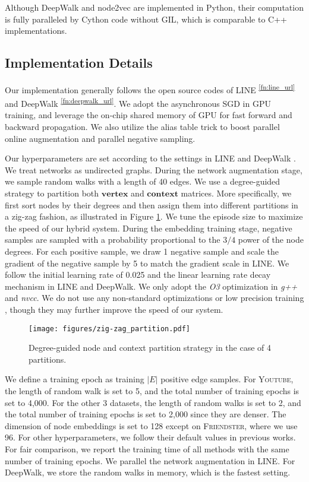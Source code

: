 \documentclass[sigconf]{acmart}
\newcommand{\dataset}[1]{\textsc{#1}\xspace}
\newcommand{\mat}[1]{\mathbf{#1}}
\begin{document}
Although DeepWalk and node2vec are implemented in Python, their computation is fully paralleled by Cython code without GIL, which is comparable to C++ implementations.

\subsection{Implementation Details}

Our implementation generally follows the open source codes of LINE \textsuperscript{\ref{fn:line_url}} and DeepWalk \textsuperscript{\ref{fn:deepwalk_url}}. We adopt the asynchronous SGD \cite{recht2011hogwild} in GPU training, and leverage the on-chip shared memory of GPU for fast forward and backward propagation. We also utilize the alias table trick \cite{tang2015line, grover2016node2vec} to boost parallel online augmentation and parallel negative sampling.

Our hyperparameters are set according to the settings in LINE \cite{tang2015line} and DeepWalk \cite{perozzi2014deepwalk}. We treat networks as undirected graphs. During the network augmentation stage, we sample random walks with a length of 40 edges. We use a degree-guided strategy to partition both $\mat{vertex}$ and $\mat{context}$ matrices. More specifically, we first sort nodes by their degrees and then assign them into different partitions in a zig-zag fashion, as illustrated in Figure \ref{fig:zig-zag_partition}. We tune the episode size to maximize the speed of our hybrid system. During the embedding training stage, negative samples are sampled with a probability proportional to the $3/4$ power of the node degrees. For each positive sample, we draw 1 negative sample and scale the gradient of the negative sample by 5 to match the gradient scale in LINE. We follow the initial learning rate of 0.025 and the linear learning rate decay mechanism in LINE and DeepWalk. We only adopt the \textit{O3} optimization in \textit{g++} and \textit{nvcc}. We do not use any non-standard optimizations or low precision training \cite{zhou2016dorefa, micikevicius2017mixed}, though they may further improve the speed of our system.

\begin{figure}[!h]
    \centering
    \texttt{[image: figures/zig-zag\_partition.pdf]}
    \caption{Degree-guided node and context partition strategy in the case of 4 partitions.}
    \label{fig:zig-zag_partition}
\end{figure}

We define a training epoch as training $|E|$ positive edge samples. For \dataset{Youtube}, the length of random walk is set to 5, and the total number of training epochs is set to 4,000. For the other 3 datasets, the length of random walks is set to 2, and the total number of training epochs is set to 2,000 since they are denser. The dimension of node embeddings is set to 128 except on \dataset{Friendster}, where we use 96. For other hyperparameters, we follow their default values in previous works. For fair comparison, we report the training time of all methods with the same number of training epochs. We parallel the network augmentation in LINE. For DeepWalk, we store the random walks in memory, which is the fastest setting.
\end{document}
